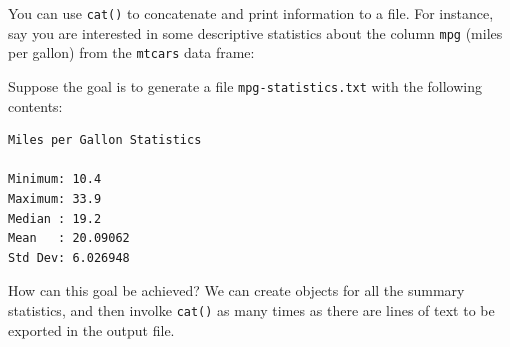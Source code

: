 \documentclass[
]{book}
\newenvironment{Shaded}{\begin{snugshade}}{\end{snugshade}}
\newcommand{\CommentTok}[1]{\textcolor[rgb]{0.56,0.35,0.01}{\textit{#1}}}
\newcommand{\FunctionTok}[1]{\textcolor[rgb]{0.00,0.00,0.00}{#1}}
\newcommand{\NormalTok}[1]{#1}
\newcommand{\SpecialCharTok}[1]{\textcolor[rgb]{0.00,0.00,0.00}{#1}}
\begin{document}
You can use \texttt{cat()} to concatenate and print information to a file.
For instance, say you are interested in some descriptive statistics about
the column \texttt{mpg} (miles per gallon) from the \texttt{mtcars} data frame:

\begin{Shaded}
\end{Shaded}

Suppose the goal is to generate a file \texttt{mpg-statistics.txt} with the following
contents:

\begin{verbatim}
Miles per Gallon Statistics

Minimum: 10.4 
Maximum: 33.9 
Median : 19.2 
Mean   : 20.09062 
Std Dev: 6.026948
\end{verbatim}

How can this goal be achieved? We can create objects for all the summary
statistics, and then involke \texttt{cat()} as many times as there are lines of text
to be exported in the output file.
\end{document}
